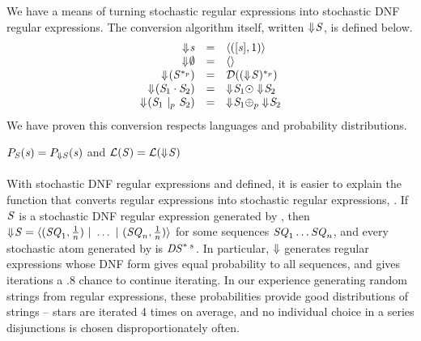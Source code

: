 \documentclass[acmsmall,screen,anonymous]{acmart}
\begin{document}
We have a means of turning stochastic regular expressions into stochastic DNF
regular expressions. The conversion algorithm itself, written
$\Downarrow\mkern-4mu \mathit{S}$, is defined below.
\[
  \begin{array}{rcl}
    \ToDNFRegexOf{\String} & = & \DNFOf{(\SequenceOf{\String},1)}\\
    \ToDNFRegexOf{\emptyset} & = & \DNFOf{}\\
    \ToDNFRegexOf{(\PRegexStar{\Regex}{\Probability})} & = & \AtomToDNFOf{\PRegexStar{(\ToDNFRegexOf{\Regex})}{\Probability}}\\
    \ToDNFRegexOf{(\RegexConcat{\Regex_1}{\Regex_2})} & = & \ToDNFRegexOf{\Regex_1} \ConcatDNF \ToDNFRegexOf{\Regex_2}\\
    \ToDNFRegexOf{(\PRegexOr{\Regex_1}{\Regex_2}{\Probability})} & = & \ToDNFRegexOf{\Regex_1} \OrDNF_{\Probability} \ToDNFRegexOf{\Regex_2}\\
  \end{array}
\]
We have proven this conversion respects languages and probability
distributions.

\begin{theorem}
  $P_{\mathit{S}}(\mathit{s}) = P_{\Downarrow
    \mathit{S}}(\mathit{s})$ and $\mathcal{L}(\mathit{S}) =
  \mathcal{L}(\Downarrow\mkern-4mu \mathit{S})$
\end{theorem}

\paragraph*{\ToStochastic} With stochastic DNF regular expressions and
\ToDNFRegex defined, it is easier to explain the function that converts regular
expressions into stochastic regular expressions, \ToStochastic{}. If $\mathit{S}$ is a
stochastic DNF regular expression generated by \ToStochastic, then
$\Downarrow\mkern-4mu \mathit{S} = \langle(\mathit{SQ}_1,\frac{1}{n}) ~|~ \ldots ~|~
  (\mathit{SQ}_n,\frac{1}{n})\rangle$ for some sequences $\mathit{SQ}_1\ldots\mathit{SQ}_n$,
and every stochastic atom generated by \ToStochastic is
$\mathit{DS}^{*_{.8}}$. In particular, $\Downarrow$ generates regular
expressions whose DNF form gives equal probability to all sequences, and gives
iterations a .8 chance to continue iterating. In our experience generating
random strings from regular expressions, these probabilities provide good
distributions of strings -- stars are iterated 4 times on average, and no
individual choice in a series disjunctions is chosen disproportionately often.
\end{document}
